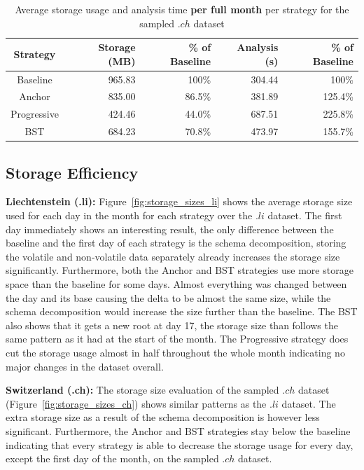 \begin{table}
    \centering \caption{Average storage usage and analysis time \textbf{per full month} per strategy for the sampled $.ch$ dataset}
    \label{tab:overview_ch}
    \footnotesize
    \begin{tabular}{|c|r|r|r|r|} \hline
        Strategy    & Storage (MB) & \% of Baseline & Analysis (s) & \% of Baseline \\ \hline
        Baseline    & 965.83       & 100\%          & 304.44       & 100\%          \\
        Anchor      & 835.00       & 86.5\%         & 381.89       & 125.4\%        \\
        Progressive & 424.46       & 44.0\%         & 687.51       & 225.8\%        \\
        BST         & 684.23       & 70.8\%         & 473.97       & 155.7\%        \\
    \hline\end{tabular}
    \vspace*{-1\baselineskip}
\end{table}

\subsection{Storage Efficiency}

\hspace{\parindent}\textbf{Liechtenstein (.li):} Figure~\ref{fig:storage_sizes_li} shows the average storage size used for each day in the month for each 
strategy over the $.li$ dataset. The first day immediately shows an interesting result, the only difference between
the baseline and the first day of each strategy is the schema decomposition, storing the volatile and non-volatile 
data separately already increases the storage size significantly. Furthermore, both the Anchor and BST strategies 
use more storage space than the baseline for some days. Almost everything was changed between the day and its base 
causing the delta to be almost the same size, while the schema decomposition would increase the size further than 
the baseline. The BST also shows that it gets a new root at day 17, the storage size than follows the same pattern 
as it had at the start of the month. The Progressive strategy does cut the storage usage almost in half throughout 
the whole month indicating no major changes in the dataset overall.

\textbf{Switzerland (.ch):} The storage size evaluation of the sampled $.ch$ dataset (Figure~\ref{fig:storage_sizes_ch}) shows similar patterns as the $.li$ dataset.
The extra storage size as a result of the schema decomposition is however less significant. Furthermore, the Anchor and BST strategies 
stay below the baseline indicating that every strategy is able to decrease the storage usage for every day, except the first day of the month,
on the sampled $.ch$ dataset.

